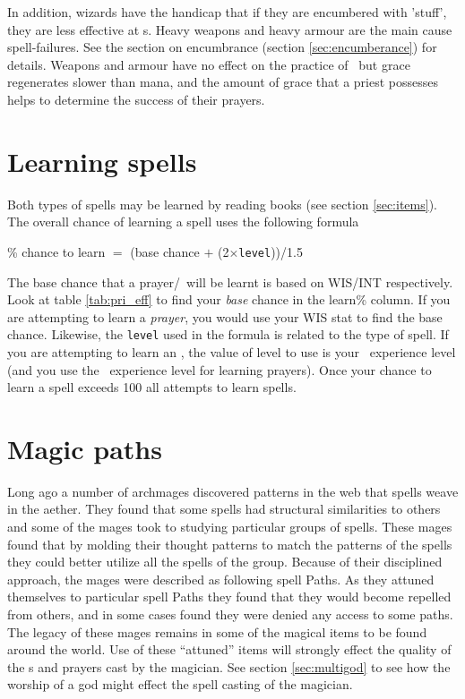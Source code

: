 {{In addition, wizards 
have the handicap that if they are encumbered with 'stuff', they are 
less effective at \incantation s.  Heavy weapons and 
heavy armour are the main cause spell-failures. See the section
on encumbrance (section \ref{sec:encumberance}) for details.  
Weapons and armour have no effect on the practice of \divinemagic\ 
but grace regenerates slower than mana, and the amount of grace
that a priest possesses helps to determine the success of their
prayers.  
 
\section{Learning spells}\label{sec:spell_learn}

Both types of spells may be learned by reading books (see section 
\ref{sec:items}). 
The overall chance of learning a spell uses the following formula \\ 
\begin{center}
\% chance to learn $=$ (base chance $+$ (2$\times${\tt level}))/1.5 \\ 
\end{center}
The base chance that a prayer/\incantation\ will be learnt is based on WIS/INT
respectively. Look at table \ref{tab:pri_eff} to find your {\em base}
chance in the learn\% column. If you are attempting to learn a {\em prayer},
you would use your WIS stat to find the base chance. Likewise, the {\tt level}
used in the formula is related to the type of spell. If you are attempting
to learn an \incantation , the value of level to use is your \mage\ experience
level (and you use the \priest\ experience level for learning prayers). 
Once your chance to learn a spell exceeds 100%
all attempts to learn spells. 
 

\section{Magic paths} \label{sec:magicpath} 

Long ago a number of archmages discovered patterns in the web that spells
weave in the aether. They found that some spells had structural similarities
to others and some of the mages took to studying particular groups of spells.
These mages found that by molding their thought patterns to match the patterns
of the spells they could better utilize all the spells of the group. Because
of their disciplined approach, the mages were described as following spell
Paths. As they attuned themselves to particular spell Paths they found that
they would become repelled from others, and in some cases found they were
denied any access to some paths. The legacy of these mages remains in some
of the magical items to be found around the world. Use of these ``attuned'' 
items will strongly effect the quality of the \incantation s and prayers cast by 
the magician. See section \ref{sec:multigod} to see how the worship of 
a god might effect the spell casting of the magician. 


}}

